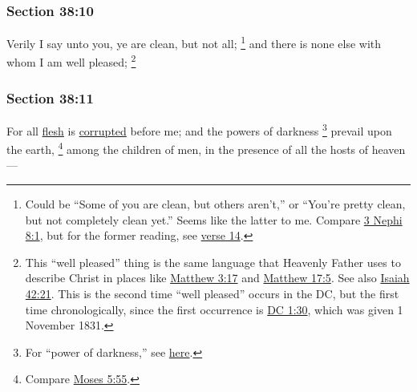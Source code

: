 	\subsubsection{Section 38:10} %
		\label{DC38-10}

		Verily I say unto you, ye are clean, but not all;%
			\footnote{%
				Could be ``Some of you are clean, but others aren't,'' or ``You're pretty clean, but not completely clean yet.'' Seems like the latter to me. Compare \hyperref[3NEPHI-8-1]{3 Nephi 8:1}, but for the former reading, see \hyperref[DC38-14]{verse 14}.
				}
		and there is none else with whom I am well pleased;%
			\footnote{%
				This ``well pleased'' thing is the same language that Heavenly Father uses to describe Christ in places like \hyperref[MATTHEW-3-17]{Matthew 3:17} and \hyperref[MATTHEW-17-5]{Matthew 17:5}. See also \hyperref[ISAIAH-42-21]{Isaiah 42:21}. This is the second time ``well pleased'' occurs in the DC, but the first time chronologically, since the first occurrence is \hyperref[DC1-30]{DC 1:30}, which was given 1 November 1831.
				}


	\subsubsection{Section 38:11} %
		\label{DC38-11}

		For all \hyperref[FLESH]{flesh} is \hyperref[CORRUPTION]{corrupted} before me; and the powers of darkness%
		\footnote{%
			For ``power of darkness,'' see \hyperref[POWER-PHRASES]{here}.
			} 
		prevail upon the earth,%
			\footnote{%
				Compare \hyperref[MOSES-5-55]{Moses 5:55}.
				} 
		among the children of men, in the presence of all the hosts of heaven---


